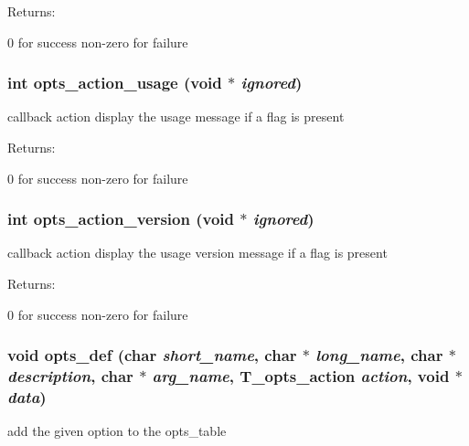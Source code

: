 \begin{Desc}
\item[Returns: ]\par
0 for success non-zero for failure \end{Desc}
\subsubsection{\setlength{\rightskip}{0pt plus 5cm}int opts\_\-action\_\-usage (void $\ast$ {\em ignored})}\label{opts__utils_8h_a19}


callback action display the usage message if a flag is present

\begin{Desc}
\item[Returns: ]\par
0 for success non-zero for failure \end{Desc}
\subsubsection{\setlength{\rightskip}{0pt plus 5cm}int opts\_\-action\_\-version (void $\ast$ {\em ignored})}\label{opts__utils_8h_a20}


callback action display the usage version message if a flag is present

\begin{Desc}
\item[Returns: ]\par
0 for success non-zero for failure \end{Desc}
\subsubsection{\setlength{\rightskip}{0pt plus 5cm}void opts\_\-def (char {\em short\_\-name}, char $\ast$ {\em long\_\-name}, char $\ast$ {\em description}, char $\ast$ {\em arg\_\-name}, {\bf T\_\-opts\_\-action} {\em action}, void $\ast$ {\em data})}\label{opts__utils_8h_a12}


add the given option to the opts\_\-table

